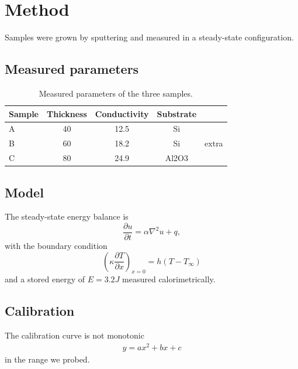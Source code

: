 \section{Method}
\label{sec:method}

Samples were grown by sputtering and measured in a steady-state configuration.

\subsection{Measured parameters}

\begin{table}[t]
\centering
\caption{Measured parameters of the three samples.}
\label{tab:params}
\begin{tabular}{lccc}
\toprule
Sample & Thickness & Conductivity & Substrate \\
\midrule
A & 40 & 12.5 & Si \\
B & 60 & 18.2 & Si & extra \\
C & 80 & 24.9 & Al2O3 \\
\bottomrule
\end{tabular}
\end{table}

\subsection{Model}

The steady-state energy balance is
\begin{equation}
\frac{\partial u}{\partial t} = \alpha \nabla^2 u + q,
\label{eq:balance}
\end{equation}
with the boundary condition
\begin{equation}
\left( \kappa \frac{\partial T}{\partial x} \right)_{x=0} = h (T - T_\infty)
\label{eq:bc}
\end{equation}
and a stored energy of $E = 3.2 J$ measured calorimetrically.

\subsection{Calibration}

The calibration curve is not monotonic
\begin{align}
y = a x^2 + b x + c
\end{align}
in the range we probed.
